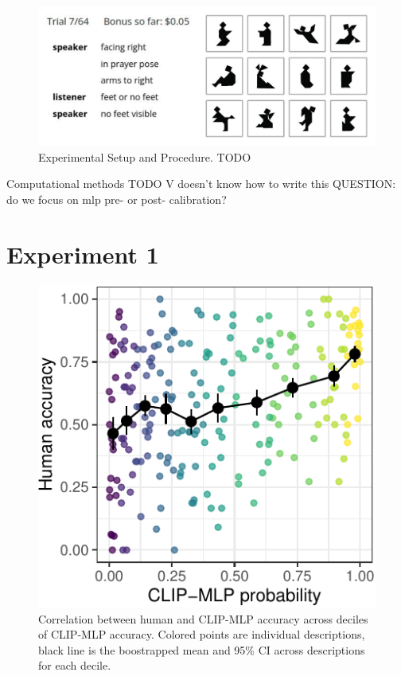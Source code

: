 \documentclass[10pt, letterpaper]{article}
\begin{document}
\begin{CodeChunk}
\begin{figure}[t!]

{\centering \includegraphics[width=1\linewidth]{matcher-diagram} 

}

\caption[Experimental Setup and Procedure]{Experimental Setup and Procedure. TODO \label{game}}\label{fig:interface}
\end{figure}
\end{CodeChunk}

Computational methods TODO V doesn't know how to write this QUESTION: do
we focus on mlp pre- or post- calibration?

\section{Experiment 1}\label{experiment-1}

\begin{CodeChunk}
\begin{figure}[t]

{\centering \includegraphics[width=0.7\linewidth]{figs/fig-calibration-1} 

}

\caption[Correlation between human and CLIP-MLP accuracy across deciles of CLIP-MLP accuracy]{Correlation between human and CLIP-MLP accuracy across deciles of CLIP-MLP accuracy. Colored points are individual descriptions, black line is the boostrapped mean and 95\% CI across descriptions for each decile. \label{calibration}}\label{fig:fig-calibration}
\end{figure}
\end{CodeChunk}
\end{document}
